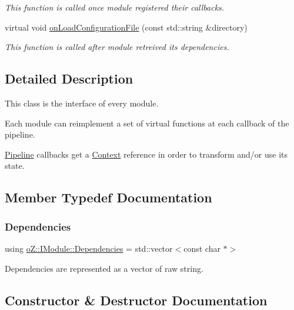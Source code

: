 \begin{DoxyCompactItemize}
\begin{DoxyCompactList}\small\item\em This function is called once module registered their callbacks. \end{DoxyCompactList}\item 
virtual void \mbox{\hyperlink{classo_z_1_1_i_module_a61a2cc76594401ed2f50931a6a6b76f3}{on\+Load\+Configuration\+File}} (const std\+::string \&directory)
\begin{DoxyCompactList}\small\item\em This function is called after module retreived its dependencies. \end{DoxyCompactList}\end{DoxyCompactItemize}


\subsection{Detailed Description}
This class is the interface of every module. 

Each module can reimplement a set of virtual functions at each callback of the pipeline.

\mbox{\hyperlink{classo_z_1_1_pipeline}{Pipeline}} callbacks get a \mbox{\hyperlink{classo_z_1_1_context}{Context}} reference in order to transform and/or use its state. 

\subsection{Member Typedef Documentation}
\mbox{\label{classo_z_1_1_i_module_ac13210556cb2a65d186bfbe5208c666c}} 
\subsubsection{\texorpdfstring{Dependencies}{Dependencies}}
{\footnotesize\ttfamily using \mbox{\hyperlink{classo_z_1_1_i_module_ac13210556cb2a65d186bfbe5208c666c}{o\+Z\+::\+I\+Module\+::\+Dependencies}} =  std\+::vector$<$const char $\ast$$>$}



Dependencies are represented as a vector of raw string. 



\subsection{Constructor \& Destructor Documentation}
\mbox{\label{classo_z_1_1_i_module_a21fdd98fb701ae6f7f0e0de14beb72de}} 
